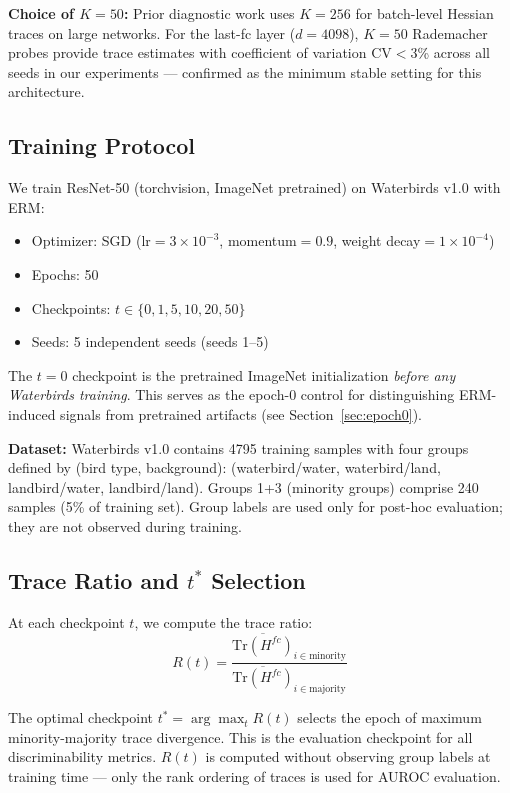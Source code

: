\textbf{Choice of $K{=}50$:} Prior diagnostic work \cite{yao2020pyhessian} uses $K{=}256$ for batch-level Hessian traces on large networks. For the last-fc layer ($d{=}4098$), $K{=}50$ Rademacher probes provide trace estimates with coefficient of variation CV$<$3\% across all seeds in our experiments --- confirmed as the minimum stable setting for this architecture.

\subsection{Training Protocol}

We train ResNet-50 (torchvision, ImageNet pretrained) on Waterbirds v1.0 with ERM:
\begin{itemize}
\item Optimizer: SGD (lr$=3{\times}10^{-3}$, momentum$=0.9$, weight decay$=1{\times}10^{-4}$)
\item Epochs: 50
\item Checkpoints: $t \in \{0, 1, 5, 10, 20, 50\}$
\item Seeds: 5 independent seeds (seeds 1--5)
\end{itemize}

The $t{=}0$ checkpoint is the pretrained ImageNet initialization \emph{before any Waterbirds training}. This serves as the epoch-0 control for distinguishing ERM-induced signals from pretrained artifacts (see Section~\ref{sec:epoch0}).

\textbf{Dataset:} Waterbirds v1.0 contains 4795 training samples with four groups defined by (bird type, background): (waterbird/water, waterbird/land, landbird/water, landbird/land). Groups 1+3 (minority groups) comprise 240 samples (5\% of training set). Group labels are used only for post-hoc evaluation; they are not observed during training.

\subsection{Trace Ratio and $t^*$ Selection}

At each checkpoint $t$, we compute the trace ratio:
\begin{equation}
R(t) = \frac{\overline{\text{Tr}(H^{fc})}_{i \in \text{minority}}}{\overline{\text{Tr}(H^{fc})}_{i \in \text{majority}}}
\end{equation}

The optimal checkpoint $t^* = \arg\max_t R(t)$ selects the epoch of maximum minority-majority trace divergence. This is the evaluation checkpoint for all discriminability metrics. $R(t)$ is computed without observing group labels at training time --- only the rank ordering of traces is used for AUROC evaluation.


